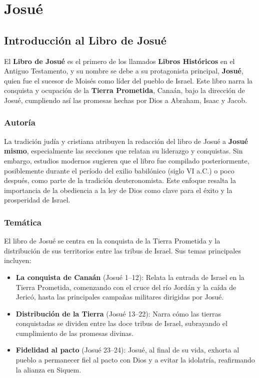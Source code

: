 
\chapter{Josué}

\section*{Introducción al Libro de Josué}

El \textbf{Libro de Josué} es el primero de los llamados \textbf{Libros Históricos} en el Antiguo Testamento, y su nombre se debe a su protagonista principal, \textbf{Josué}, quien fue el sucesor de Moisés como líder del pueblo de Israel. Este libro narra la conquista y ocupación de la \textbf{Tierra Prometida}, Canaán, bajo la dirección de Josué, cumpliendo así las promesas hechas por Dios a Abraham, Isaac y Jacob.

\subsection*{Autoría}

La tradición judía y cristiana atribuyen la redacción del libro de Josué a \textbf{Josué mismo}, especialmente las secciones que relatan su liderazgo y conquistas. Sin embargo, estudios modernos sugieren que el libro fue compilado posteriormente, posiblemente durante el período del exilio babilónico (siglo VI a.C.) o poco después, como parte de la tradición deuteronomista. Este enfoque resalta la importancia de la obediencia a la ley de Dios como clave para el éxito y la prosperidad de Israel.

\subsection*{Temática}

El libro de Josué se centra en la conquista de la Tierra Prometida y la distribución de sus territorios entre las tribus de Israel. Sus temas principales incluyen:
\begin{itemize}
	\item \textbf{La conquista de Canaán} (Josué 1–12): Relata la entrada de Israel en la Tierra Prometida, comenzando con el cruce del río Jordán y la caída de Jericó, hasta las principales campañas militares dirigidas por Josué.
	\item \textbf{Distribución de la Tierra} (Josué 13–22): Narra cómo las tierras conquistadas se dividen entre las doce tribus de Israel, subrayando el cumplimiento de las promesas divinas.
	\item \textbf{Fidelidad al pacto} (Josué 23–24): Josué, al final de su vida, exhorta al pueblo a permanecer fiel al pacto con Dios y a evitar la idolatría, reafirmando la alianza en Siquem.
\end{itemize}



